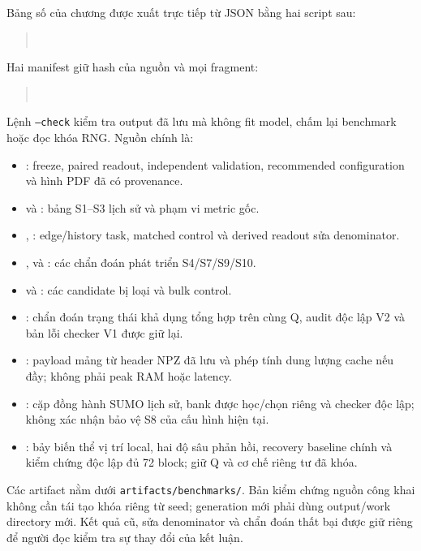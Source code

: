 Bảng số của chương được xuất trực tiếp từ JSON bằng hai script sau:
\begin{quote}\small
{}\\
\end{quote}
Hai manifest giữ hash của nguồn và mọi fragment:
\begin{quote}\small
{}\\
\end{quote}
Lệnh \texttt{--check} kiểm tra output đã lưu mà không
fit model, chấm lại benchmark hoặc đọc khóa RNG. Nguồn chính là:
\begin{itemize}
  \item {}:
  freeze, paired readout, independent validation, recommended configuration
  và hình PDF đã có provenance.
  \item {} và :
  bảng S1--S3 lịch sử và phạm vi metric gốc.
  \item {},
  :
  edge/history task, matched control và derived readout sửa denominator.
  \item {},
   và
  :
  các chẩn đoán phát triển S4/S7/S9/S10.
  \item {} và
  :
  các candidate bị loại và bulk control.
  \item {}:
  chẩn đoán trạng thái khả dụng tổng hợp trên cùng Q, audit độc lập V2 và
  bản lỗi checker V1 được giữ lại.
  \item {}:
  payload mảng từ header NPZ đã lưu và phép tính dung lượng cache nếu đầy;
  không phải peak RAM hoặc latency.
  \item {}:
  cặp đồng hành SUMO lịch sử, bank được học/chọn riêng và checker độc lập;
  không xác nhận bảo vệ S8 của cấu hình hiện tại.
  \item {}:
  bảy biến thể vị trí local, hai độ sâu phản hồi, recovery baseline chính
  và kiểm chứng độc lập đủ 72 block; giữ Q và cơ chế riêng tư đã khóa.
\end{itemize}
Các artifact nằm dưới \texttt{artifacts/benchmarks/}. Bản kiểm chứng nguồn
công khai không cần tái tạo khóa riêng từ seed; generation mới phải dùng
output/work directory mới. Kết quả cũ, sửa denominator và chẩn đoán thất bại
được giữ riêng để người đọc kiểm tra sự thay đổi của kết luận.
\par\endgroup
